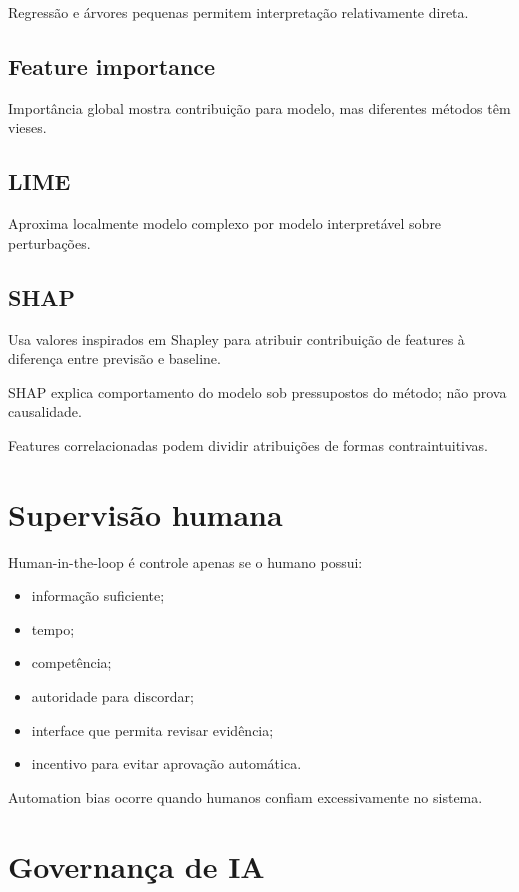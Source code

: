 Regressão e árvores pequenas permitem interpretação relativamente direta.

\subsection{Feature importance}

Importância global mostra contribuição para modelo, mas diferentes métodos têm vieses.

\subsection{LIME}

Aproxima localmente modelo complexo por modelo interpretável sobre perturbações.

\subsection{SHAP}

Usa valores inspirados em Shapley para atribuir contribuição de features à diferença entre previsão e baseline.

SHAP explica comportamento do modelo sob pressupostos do método; não prova causalidade.

Features correlacionadas podem dividir atribuições de formas contraintuitivas.

\section{Supervisão humana}

Human-in-the-loop é controle apenas se o humano possui:
\begin{itemize}
\item informação suficiente;
\item tempo;
\item competência;
\item autoridade para discordar;
\item interface que permita revisar evidência;
\item incentivo para evitar aprovação automática.
\end{itemize}

Automation bias ocorre quando humanos confiam excessivamente no sistema.

\section{Governança de IA}

